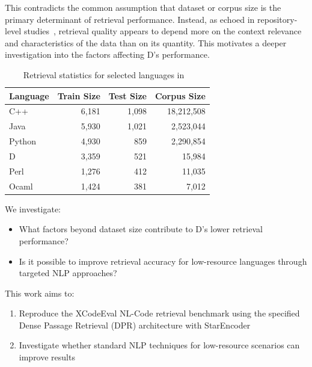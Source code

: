 \documentclass[12pt]{article}
\begin{document}
This contradicts the common assumption that dataset or corpus size is the primary determinant of retrieval performance. Instead, as echoed in repository-level studies~\cite{Zhang2023}, retrieval quality appears to depend more on the context relevance and characteristics of the data than on its quantity. This motivates a deeper investigation into the factors affecting D's performance.

\begin{table}[ht]
\centering
\caption{Retrieval statistics for selected languages in ~\cite{Khan2023}}
\label{tab:xcodeeval-selected}
\begin{tabular}{lrrr}
\hline
\textbf{Language} & \textbf{Train Size} & \textbf{Test Size} & \textbf{Corpus Size} \\
\hline
C++     & 6,181  & 1,098   & 18,212,508 \\
Java    & 5,930  & 1,021   & 2,523,044 \\
Python  & 4,930  & 859     & 2,290,854 \\
D       & 3,359  & 521     & 15,984 \\
Perl    & 1,276  & 412     & 11,035 \\
Ocaml   & 1,424  & 381     & 7,012 \\
\hline
\end{tabular}
\end{table}

We investigate:
\begin{itemize}
    \item What factors beyond dataset size contribute to D's lower retrieval performance?
    \item Is it possible to improve retrieval accuracy for low-resource languages through targeted NLP approaches?
\end{itemize}

This work aims to:
\begin{enumerate}
    \item Reproduce the XCodeEval NL-Code retrieval benchmark using the specified Dense Passage Retrieval (DPR) architecture with StarEncoder \cite{Li2023}
    \item Investigate whether standard NLP techniques for low-resource scenarios can improve results
\end{enumerate}
\end{document}
